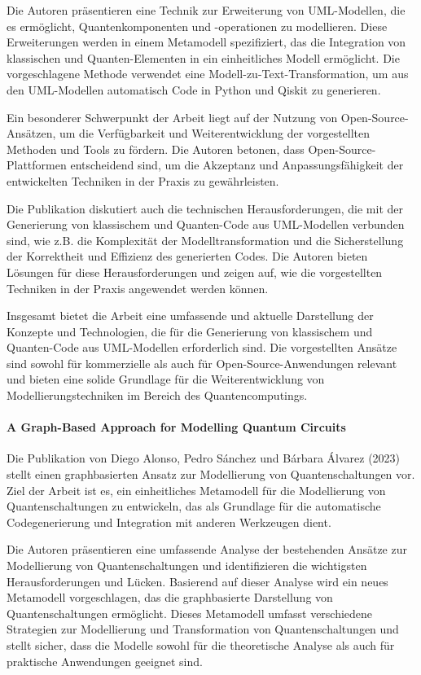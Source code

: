 Die Autoren präsentieren eine Technik zur Erweiterung von UML-Modellen, die es ermöglicht, Quantenkomponenten 
und -operationen zu modellieren. Diese Erweiterungen werden in einem Metamodell spezifiziert, das die Integration 
von klassischen und Quanten-Elementen in ein einheitliches Modell ermöglicht. Die vorgeschlagene Methode verwendet 
eine Modell-zu-Text-Transformation, um aus den UML-Modellen automatisch Code in Python und Qiskit zu generieren.

Ein besonderer Schwerpunkt der Arbeit liegt auf der Nutzung von Open-Source-Ansätzen, um die Verfügbarkeit und 
Weiterentwicklung der vorgestellten Methoden und Tools zu fördern. Die Autoren betonen, dass Open-Source-Plattformen 
entscheidend sind, um die Akzeptanz und Anpassungsfähigkeit der entwickelten Techniken in der Praxis zu gewährleisten.

Die Publikation diskutiert auch die technischen Herausforderungen, die mit der Generierung von klassischem und 
Quanten-Code aus UML-Modellen verbunden sind, wie z.B. die Komplexität der Modelltransformation und die Sicherstellung 
der Korrektheit und Effizienz des generierten Codes. Die Autoren bieten Lösungen für diese Herausforderungen und 
zeigen auf, wie die vorgestellten Techniken in der Praxis angewendet werden können.

Insgesamt bietet die Arbeit eine umfassende und aktuelle Darstellung der Konzepte und Technologien, die für die 
Generierung von klassischem und Quanten-Code aus UML-Modellen erforderlich sind. Die vorgestellten Ansätze sind 
sowohl für kommerzielle als auch für Open-Source-Anwendungen relevant und bieten eine solide Grundlage für die 
Weiterentwicklung von Modellierungstechniken im Bereich des Quantencomputings.

\paragraph{A Graph-Based Approach for Modelling Quantum Circuits}

Die Publikation von Diego Alonso, Pedro Sánchez und Bárbara Álvarez (2023)~\cite{alonso2023graph} stellt einen graphbasierten Ansatz zur 
Modellierung von Quantenschaltungen vor. Ziel der Arbeit ist es, ein einheitliches Metamodell für die Modellierung 
von Quantenschaltungen zu entwickeln, das als Grundlage für die automatische Codegenerierung und Integration mit 
anderen Werkzeugen dient.

Die Autoren präsentieren eine umfassende Analyse der bestehenden Ansätze zur Modellierung von Quantenschaltungen 
und identifizieren die wichtigsten Herausforderungen und Lücken. Basierend auf dieser Analyse wird ein neues Metamodell 
vorgeschlagen, das die graphbasierte Darstellung von Quantenschaltungen ermöglicht. Dieses Metamodell umfasst 
verschiedene Strategien zur Modellierung und Transformation von Quantenschaltungen und stellt sicher, dass die 
Modelle sowohl für die theoretische Analyse als auch für praktische Anwendungen geeignet sind.

